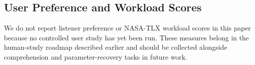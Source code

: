 \documentclass[sigchi, nonacm]{acmart}
\begin{document}



\subsection{User Preference and Workload Scores}
\label{sec:preference}

We do not report listener preference or NASA-TLX workload scores in this
paper because no controlled user study has yet been run. These measures
belong in the human-study roadmap described earlier and should be
collected alongside comprehension and parameter-recovery tasks in future
work.
\end{document}
